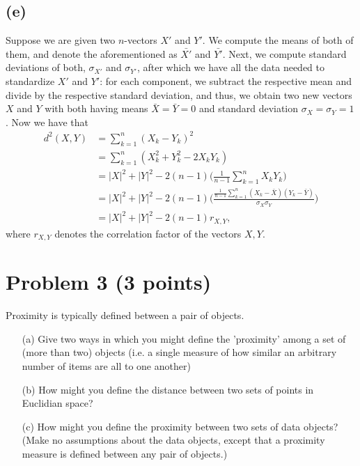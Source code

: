 \documentclass[10pt]{article}
\begin{document}
\subsection*{(e)}
Suppose we are given two $n$-vectors $X'$ and $Y'$. We compute the means of both of them, and denote the aforementioned as $\bar{X'}$ and $\bar{Y'}$. Next, we compute standard deviations of both, $\sigma_{X'}$ and $\sigma_{Y'}$, after which we have all the data needed to standardize $X'$ and $Y'$: for each component, we subtract the respective mean and divide by the respective standard deviation, and thus, we obtain two new vectors $X$ and $Y$ with both having means $\bar{X} = \bar{Y} = 0$ and standard deviation $\sigma_X = \sigma_Y = 1$.  Now we have that
\begin{align*}
d^2(X, Y) &= \sum_{k = 1}^n (X_k - Y_k)^2 \\
                 &= \sum_{k = 1}^n (X_k^2 + Y_k^2 - 2X_k Y_k) \\
                 &= |X|^2 + |Y|^2 - 2(n - 1) \Bigg( \frac{1}{n - 1} \sum_{k = 1}^n X_k Y_k \Bigg) \\
                 &= |X|^2 + |Y|^2 - 2(n - 1) \Bigg( \frac{\frac{1}{n - 1} \sum_{k = 1}^n (X_k - \bar{X})(Y_k - \bar{Y})}{\sigma_X \sigma_Y}\Bigg) \\
                 &= |X|^2 + |Y|^2 - 2(n - 1)r_{X, Y},
\end{align*}
where $r_{X, Y}$ denotes the correlation factor of the vectors $X, Y$.

\color{red}
\section*{Problem 3 (3 points)}
Proximity is typically defined between a pair of objects.
\begin{itemize}
\item[(a)] Give two ways in which you might define the 'proximity' among a set of (more than two) objects (i.e. a single measure of how similar an arbitrary number of items are all to one another)
\item[(b)] How might you define the distance between two sets of points in Euclidian space?
\item[(c)] How might you define the proximity between two sets of data objects? (Make no assumptions about the data objects, except that a proximity measure is defined between any pair of objects.)
\end{itemize}

\color{black}
\end{document}
